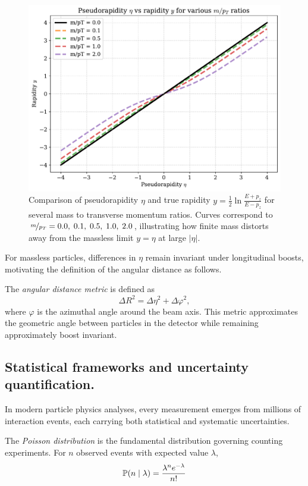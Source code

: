 \begin{figure}
  \centering
  \includegraphics[width=\textwidth]{figures/chapter-01/rapidity.pdf}
  \caption[\(\eta\) vs. \(y\) for various $\nicefrac{m}{p_T}$]{%
    Comparison of pseudorapidity $\eta$ and true rapidity
    $y=\frac12\ln\frac{E+p_z}{E-p_z}$ for several mass to transverse momentum ratios.
    Curves correspond to $\nicefrac{m}{p_T} = 0.0,\;0.1,\;0.5,\;1.0,\;2.0$, illustrating how finite mass distorts away from the massless limit $y=\eta$ at large $|\eta|$.
  }
  \label{fig:eta_vs_y}
\end{figure}
For massless particles, differences in \(\eta\) remain invariant under longitudinal boosts, motivating the definition of the angular distance as follows.

\begin{definition}
    The \emph{angular distance metric} is defined as
    \[
        \Delta R^2 = \Delta\eta^2 + \Delta\varphi^2,
    \]
    where \(\varphi\) is the azimuthal angle around the beam axis.
    This metric approximates the geometric angle between particles in the detector while remaining approximately boost invariant.
\end{definition}
    \subsection{Statistical frameworks and uncertainty quantification.}
        In modern particle physics analyses, every measurement emerges from millions of interaction events, each carrying both statistical and systematic uncertainties.
        \begin{definition}
            The \emph{Poisson distribution} is the fundamental distribution governing counting experiments.
            For \(n\) observed events with expected value \(\lambda\),
            \[
                \P(n\mid\lambda) = \frac{\lambda^n e^{-\lambda}}{n!}
            \]
        \end{definition}

